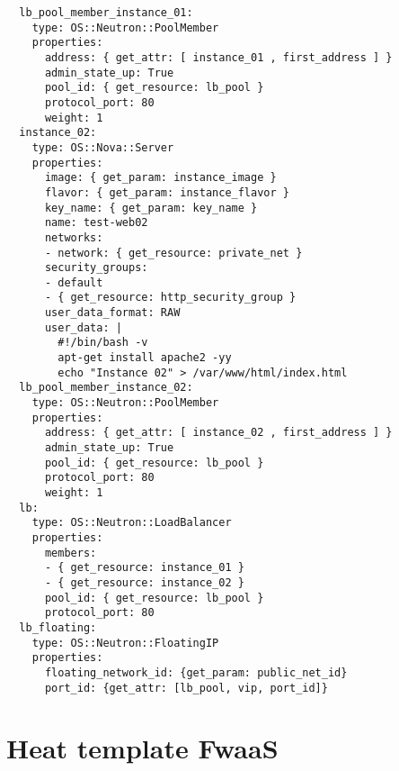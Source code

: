 \begin{lstlisting}
  lb_pool_member_instance_01:
    type: OS::Neutron::PoolMember
    properties:
      address: { get_attr: [ instance_01 , first_address ] }
      admin_state_up: True
      pool_id: { get_resource: lb_pool }
      protocol_port: 80
      weight: 1
  instance_02:
    type: OS::Nova::Server
    properties:
      image: { get_param: instance_image }
      flavor: { get_param: instance_flavor }
      key_name: { get_param: key_name }
      name: test-web02
      networks:
      - network: { get_resource: private_net }
      security_groups:
      - default
      - { get_resource: http_security_group }
      user_data_format: RAW
      user_data: |
        #!/bin/bash -v
        apt-get install apache2 -yy
        echo "Instance 02" > /var/www/html/index.html
  lb_pool_member_instance_02:
    type: OS::Neutron::PoolMember
    properties:
      address: { get_attr: [ instance_02 , first_address ] }
      admin_state_up: True
      pool_id: { get_resource: lb_pool }
      protocol_port: 80
      weight: 1
  lb:
    type: OS::Neutron::LoadBalancer
    properties:
      members:
      - { get_resource: instance_01 }
      - { get_resource: instance_02 }
      pool_id: { get_resource: lb_pool }
      protocol_port: 80
  lb_floating:
    type: OS::Neutron::FloatingIP
    properties:
      floating_network_id: {get_param: public_net_id}
      port_id: {get_attr: [lb_pool, vip, port_id]}
\end{lstlisting}

\chapter{Heat template FwaaS}

